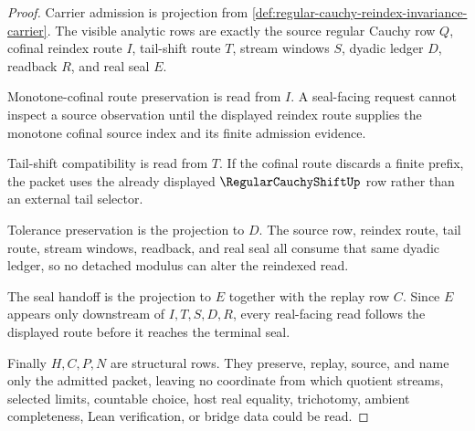 \begin{proof}
Carrier admission is projection from \autoref{def:regular-cauchy-reindex-invariance-carrier}. The visible analytic rows are exactly the source regular Cauchy row $Q$, cofinal reindex route $I$, tail-shift route $T$, stream windows $S$, dyadic ledger $D$, readback $R$, and real seal $E$.

Monotone-cofinal route preservation is read from $I$. A seal-facing request cannot inspect a source observation until the displayed reindex route supplies the monotone cofinal source index and its finite admission evidence.

Tail-shift compatibility is read from $T$. If the cofinal route discards a finite prefix, the packet uses the already displayed $\RegularCauchyShiftUp$ row rather than an external tail selector.

Tolerance preservation is the projection to $D$. The source row, reindex route, tail route, stream windows, readback, and real seal all consume that same dyadic ledger, so no detached modulus can alter the reindexed read.

The seal handoff is the projection to $E$ together with the replay row $C$. Since $E$ appears only downstream of $I,T,S,D,R$, every real-facing read follows the displayed route before it reaches the terminal seal.

Finally $H,C,P,N$ are structural rows. They preserve, replay, source, and name only the admitted packet, leaving no coordinate from which quotient streams, selected limits, countable choice, host real equality, trichotomy, ambient completeness, Lean verification, or bridge data could be read.
\end{proof}

